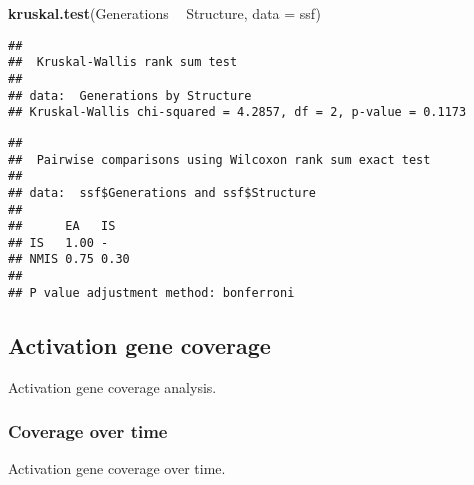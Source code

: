 \documentclass[]{book}
\newenvironment{Shaded}{\begin{snugshade}}{\end{snugshade}}
\newcommand{\DataTypeTok}[1]{\textcolor[rgb]{0.13,0.29,0.53}{#1}}
\newcommand{\KeywordTok}[1]{\textcolor[rgb]{0.13,0.29,0.53}{\textbf{#1}}}
\newcommand{\NormalTok}[1]{#1}
\newcommand{\OperatorTok}[1]{\textcolor[rgb]{0.81,0.36,0.00}{\textbf{#1}}}
\newcommand{\OtherTok}[1]{\textcolor[rgb]{0.56,0.35,0.01}{#1}}
\newcommand{\StringTok}[1]{\textcolor[rgb]{0.31,0.60,0.02}{#1}}
\begin{document}
\begin{Shaded}
\begin{Highlighting}[]
\KeywordTok{kruskal.test}\NormalTok{(Generations }\OperatorTok{~}\StringTok{ }\NormalTok{Structure, }\DataTypeTok{data =}\NormalTok{ ssf)}
\end{Highlighting}
\end{Shaded}

\begin{verbatim}
## 
##  Kruskal-Wallis rank sum test
## 
## data:  Generations by Structure
## Kruskal-Wallis chi-squared = 4.2857, df = 2, p-value = 0.1173
\end{verbatim}

\begin{Shaded}
\end{Shaded}

\begin{verbatim}
## 
##  Pairwise comparisons using Wilcoxon rank sum exact test 
## 
## data:  ssf$Generations and ssf$Structure 
## 
##      EA   IS  
## IS   1.00 -   
## NMIS 0.75 0.30
## 
## P value adjustment method: bonferroni
\end{verbatim}

\hypertarget{activation-gene-coverage-10}{%
\subsection{Activation gene coverage}\label{activation-gene-coverage-10}}

Activation gene coverage analysis.

\hypertarget{coverage-over-time-16}{%
\subsubsection{Coverage over time}\label{coverage-over-time-16}}

Activation gene coverage over time.
\end{document}
